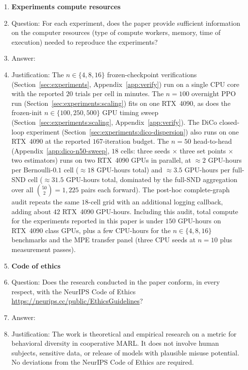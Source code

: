 \begin{enumerate}
\item {\bf Experiments compute resources}
    \item[] Question: For each experiment, does the paper provide sufficient information on the computer resources (type of compute workers, memory, time of execution) needed to reproduce the experiments?
    \item[] Answer: \answerYes{}
    \item[] Justification: The $n{\in}\{4,8,16\}$ frozen-checkpoint
    verifications (Section~\ref{sec:experiments},
    Appendix~\ref{app:verify}) run on a single CPU core with the
    reported $20$ trials per cell in minutes. The $n{=}100$ overnight
    PPO run (Section~\ref{sec:experiments:scaling}) fits on one
    RTX~4090, as does the frozen-init $n\in\{100,250,500\}$ GPU timing
    sweep (Section~\ref{sec:experiments:scaling},
    Appendix~\ref{app:verify}). The DiCo
    closed-loop experiment
    (Section~\ref{sec:experiments:dico-dispersion}) also
    runs on one RTX~4090 at the reported $167$-iteration budget.
    The $n{=}50$ head-to-head
    (Appendix~\ref{app:dico-n50-sweep}, $18$ cells: three seeds
    $\times$ three set points $\times$ two estimators) runs on two
    RTX~4090 GPUs in parallel, at ${\approx}2$ GPU-hours per
    Bernoulli-$0.1$ cell ($\approx18$ GPU-hours total) and
    ${\approx}3.5$ GPU-hours per full-SND cell
    ($\approx31.5$ GPU-hours total, dominated by the full-SND
    aggregation over all $\binom{50}{2}{=}1{,}225$ pairs each
    forward). The post-hoc complete-graph audit repeats the same
    $18$-cell grid with an additional logging callback, adding about
    $42$ RTX~4090 GPU-hours. Including this audit, total compute for
    the experiments reported in this paper is under $150$ GPU-hours on
    RTX~4090 class GPUs, plus a few CPU-hours for the
    $n{\in}\{4,8,16\}$ benchmarks and the MPE transfer panel
    (three CPU seeds at $n{=}10$ plus measurement passes).

\item {\bf Code of ethics}
    \item[] Question: Does the research conducted in the paper conform, in every respect, with the NeurIPS Code of Ethics \url{https://neurips.cc/public/EthicsGuidelines}?
    \item[] Answer: \answerYes{}
    \item[] Justification: The work is theoretical and empirical
    research on a metric for behavioral diversity in cooperative
    MARL. It does not involve human subjects, sensitive data, or
    release of models with plausible misuse potential. No deviations
    from the NeurIPS Code of Ethics are required.


\end{enumerate}
